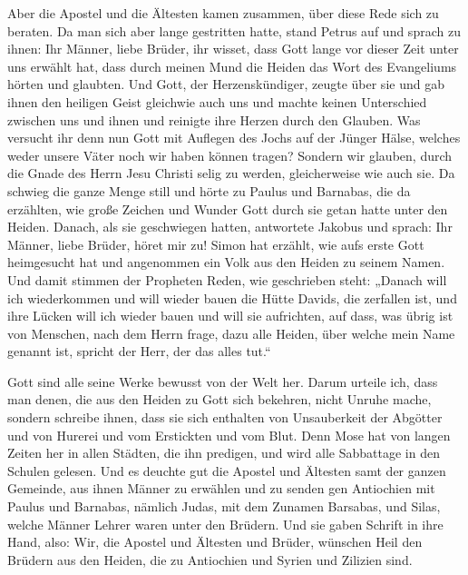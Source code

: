  Aber die Apostel und die Ältesten kamen zusammen, über
diese Rede sich zu beraten.  Da man sich aber lange
gestritten hatte, stand Petrus auf und sprach zu ihnen: Ihr Männer,
liebe Brüder, ihr wisset, dass Gott lange vor dieser Zeit unter uns
erwählt hat, dass durch meinen Mund die Heiden das Wort des Evangeliums
hörten und glaubten.  Und Gott, der Herzenskündiger,
zeugte über sie und gab ihnen den heiligen Geist gleichwie auch uns
 und machte keinen Unterschied zwischen uns und ihnen und
reinigte ihre Herzen durch den Glauben.  Was versucht ihr
denn nun Gott mit Auflegen des Jochs auf der Jünger Hälse, welches weder
unsere Väter noch wir haben können tragen?  Sondern wir
glauben, durch die Gnade des Herrn Jesu Christi selig zu werden,
gleicherweise wie auch sie.  Da schwieg die ganze Menge
still und hörte zu Paulus und Barnabas, die da erzählten, wie große
Zeichen und Wunder Gott durch sie getan hatte unter den Heiden.
 Danach, als sie geschwiegen hatten, antwortete Jakobus
und sprach: Ihr Männer, liebe Brüder, höret mir zu! 
Simon hat erzählt, wie aufs erste Gott heimgesucht hat und angenommen
ein Volk aus den Heiden zu seinem Namen.  Und damit
stimmen der Propheten Reden, wie geschrieben steht: 
„Danach will ich wiederkommen und will wieder bauen die Hütte Davids,
die zerfallen ist, und ihre Lücken will ich wieder bauen und will sie
aufrichten,  auf dass, was übrig ist von Menschen, nach
dem Herrn frage, dazu alle Heiden, über welche mein Name genannt ist,
spricht der Herr, der das alles tut.``

 Gott sind alle seine Werke bewusst von der Welt her.
 Darum urteile ich, dass man denen, die aus den Heiden zu
Gott sich bekehren, nicht Unruhe mache,  sondern schreibe
ihnen, dass sie sich enthalten von Unsauberkeit der Abgötter und von
Hurerei und vom Erstickten und vom Blut.  Denn Mose hat
von langen Zeiten her in allen Städten, die ihn predigen, und wird alle
Sabbattage in den Schulen gelesen.  Und es deuchte gut
die Apostel und Ältesten samt der ganzen Gemeinde, aus ihnen Männer zu
erwählen und zu senden gen Antiochien mit Paulus und Barnabas, nämlich
Judas, mit dem Zunamen Barsabas, und Silas, welche Männer Lehrer waren
unter den Brüdern.  Und sie gaben Schrift in ihre Hand,
also: Wir, die Apostel und Ältesten und Brüder, wünschen Heil den
Brüdern aus den Heiden, die zu Antiochien und Syrien und Zilizien sind.

